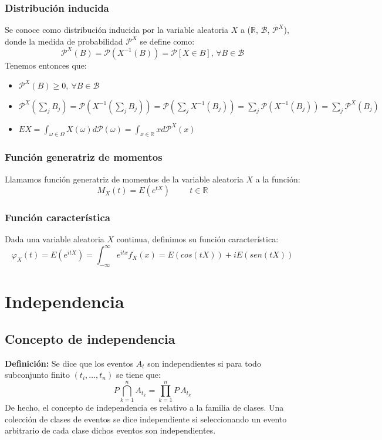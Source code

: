\documentclass[12pt,a4paper]{book}
\begin{document}
\subsection{Distribución inducida}
Se conoce como distribución inducida por la variable aleatoria $X$ a ($\mathbb{R}$, $\mathcal{B}$, $\mathcal{P}^X$), donde la medida de probabilidad $\mathcal{P}^X$ se define como:
$$ \mathcal{P}^X(B) = \mathcal{P}(X^{-1}(B)) = \mathcal{P}[X\in B], \, \forall B \in \mathcal{B} $$
Tenemos entonces que:
\begin{itemize}
\item $\mathcal{P}^X(B) \geq 0,\  \forall B \in \mathcal{B}$
\item $\displaystyle \mathcal{P}^X(\sum_j B_j) = \mathcal{P}(X^{-1}(\sum_jB_j)) = \mathcal{P}(\sum_j X^{-1}(B_j)) = \sum_j \mathcal{P}(X^{-1}(B_j)) = \sum_j \mathcal{P}^X(B_j)$
\item $\displaystyle EX = \int_{\omega \in \Omega} X(\omega) d \mathcal{P(\omega)} = \int_{x \in \mathbb{R}} x d\mathcal{P}^X(x)$
\end{itemize}

\subsection{Función generatriz de momentos}
Llamamos función generatriz de momentos de la variable aleatoria $X$ a la función:
$$ M_X(t) = E(e^{tX}) \hspace{1cm} t \in \mathbb{R} $$
\subsection{Función característica}
Dada una variable aleatoria $X$ continua, definimos su función característica:
$$\varphi_X(t)=E(e^{itX})=\int_{-\infty}^{\infty}e^{itx}f_{X}(x)=E(cos(tX))+iE(sen(tX))$$

\chapter{Independencia}
\section{Concepto de independencia}
\textbf{Definición: }Se dice que los eventos $A_t$ son independientes si para todo subconjunto finito $(t_i,\ldots ,t_n)$ se tiene que:
$$P\bigcap_{k=1}^n A_{t_k}=\displaystyle\prod_{k=1}^{n}P\, A_{t_k}$$
De hecho, el concepto de independencia es relativo a la familia de clases. Una colección de clases de eventos se dice independiente si seleccionando un evento arbitrario de cada clase dichos eventos son independientes. 
\end{document}
